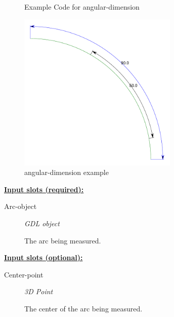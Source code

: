\documentclass [11pt]{book}
\begin{document}
\begin{itemize}
\begin{figure}
\caption{Example Code for angular-dimension}

\label{fig:example-code-angular-dimension}

\end{figure}

\begin{figure}
\begin{center}
\includegraphics[width=3in,height=3in]{../images/example-angular-dimension.pdf}
\end{center}

\caption{angular-dimension example}

\label{fig:angular-dimension}

\end{figure}





\textbf{
\underline{Input slots (required):}}

\begin{description}

\item [Arc-object]
\emph{GDL object}

 The arc being measured.




\end{description}






\textbf{
\underline{Input slots (optional):}}

\begin{description}

\item [Center-point]
\emph{3D Point}

 The center of the arc being measured.





\end{description}
\end{itemize}
\end{document}

